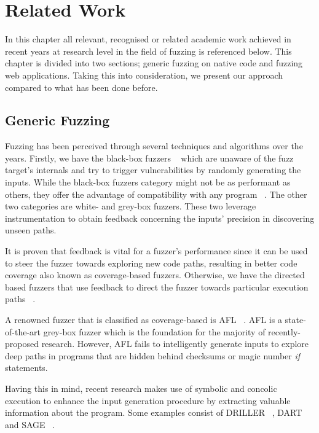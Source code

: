 \chapter{Related Work}
\label{sec:relatedwork}
\minitoc
\vspace*{1cm}

In this chapter all relevant, recognised or related academic work achieved in recent years at research level in the field of fuzzing is referenced below. This chapter is divided into two sections; generic fuzzing on native code and fuzzing web applications. Taking this into consideration, we present our approach compared to what has been done before.

\section{Generic Fuzzing}
Fuzzing has been perceived through several techniques and algorithms over the years. Firstly, we have the black-box fuzzers ~\cite{householder2012probability,sparks2007automated,woo2013scheduling} which are unaware of the fuzz target's internals and try to trigger vulnerabilities by randomly generating the inputs. While the black-box fuzzers category might not be as performant as others, they offer
the advantage of compatibility with any program ~\cite{osterlund2020parmesan,rawat2017vuzzer}. The other two categories are white- and grey-box fuzzers. These two leverage instrumentation to obtain feedback concerning the inputs' precision in discovering unseen paths. 

It is proven that feedback is vital for a fuzzer's performance since it can be used to steer the fuzzer towards exploring new code paths, resulting in better code coverage also known as
coverage-based fuzzers. Otherwise, we have the directed based fuzzers that use feedback to direct the fuzzer towards particular execution paths ~\cite{godefroid2005dart}.

A renowned fuzzer that is classified as coverage-based is AFL ~\cite{zalewski2015american}. AFL is a state-of-the-art grey-box fuzzer which is the foundation for the majority of recently-proposed research. However, AFL fails to intelligently generate inputs to explore deep paths in programs that are hidden behind checksums or magic number \emph{if} statements.

Having this in mind, recent research makes use of symbolic and concolic execution to enhance the input generation procedure by extracting valuable information about the program. Some examples consist of DRILLER ~\cite{stephens2016driller}, DART ~\cite{godefroid2005dart} and SAGE ~\cite{godefroid2012sage}. 

